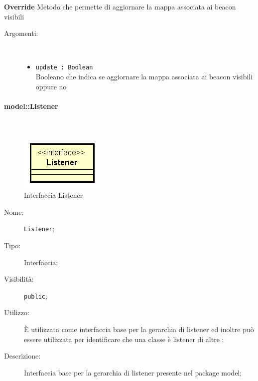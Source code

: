 \documentclass[../DefinizioneDiProdotto.tex]{subfiles}
\begin{document}
\begin{description}
\begin{itemize}
		\textbf{Override} Metodo che permette di aggiornare la mappa associata ai beacon visibili
		\begin{description}
			\item[Argomenti:] \
			\begin{itemize}
				\item \texttt{update : Boolean}\\
				Booleano che indica se aggiornare la mappa associata ai beacon visibili oppure no\end{itemize}
		\end{description}
	\end{itemize}
\end{description}

\paragraph{model::Listener}
\
\begin{figure}[H]
	\centering
	\includegraphics[width=\maxwidth]{img/Listener.png}
	\caption{Interfaccia Listener}\label{fig:model::Listener} 
\end{figure}
\begin{description}
	\item[Nome:] \texttt{Listener};
	\item[Tipo:] Interfaccia;
	\item[Visibilità:] \texttt{public};
	\item[Utilizzo:] È utilizzata come interfaccia base per la gerarchia di listener ed inoltre può essere utilizzata per identificare che una classe è listener di altre ;
	\item[Descrizione:] Interfaccia base per la gerarchia di listener presente nel package model;
\end{description}
\end{document}
